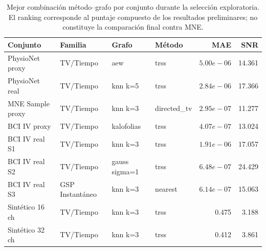 \begin{table}[htbp]
\centering
\scriptsize
\setlength{\tabcolsep}{3pt}
\caption{Mejor combinación método--grafo por conjunto durante la selección exploratoria. El ranking corresponde al puntaje compuesto de los resultados preliminares; no constituye la comparación final contra MNE.}
\label{tab:ch4_preliminary_selection_top_candidates}
\begin{tabular}{@{}p{2.2cm}p{1.85cm}p{2.4cm}p{1.85cm}rr@{}}
\toprule
Conjunto & Familia & Grafo & Método & MAE & SNR \\
\midrule
PhysioNet proxy & TV/Tiempo & aew & trss & $5.00e-06$ & 14.361 \\
PhysioNet real & TV/Tiempo & knn k=5 & trss & $2.84e-06$ & 17.366 \\
MNE Sample proxy & TV/Tiempo & knn k=3 & directed\_tv & $2.95e-07$ & 11.277 \\
BCI IV proxy & TV/Tiempo & kalofolias & trss & $4.07e-07$ & 13.024 \\
BCI IV real S1 & TV/Tiempo & knn k=3 & trss & $1.91e-06$ & 17.057 \\
BCI IV real S2 & TV/Tiempo & gauss sigma=1 & trss & $6.48e-07$ & 24.429 \\
BCI IV real S3 & GSP Instantáneo & knn k=3 & nearest & $6.14e-07$ & 15.063 \\
Sintético 16 ch & TV/Tiempo & knn k=3 & trss & 0.475 & 3.188 \\
Sintético 32 ch & TV/Tiempo & knn k=3 & trss & 0.412 & 3.861 \\
\bottomrule
\end{tabular}
\end{table}
